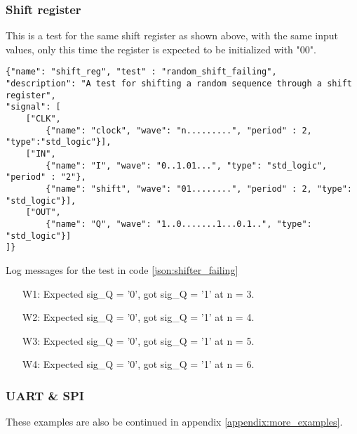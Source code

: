 \subsubsection{Shift register}
This is a test for the same shift register as shown above, with the same input values, only this time the register is expected to be initialized with "00".
\begin{lstlisting}[style=json, caption={Failing functionality test for the shifter design in appendix \ref{appendix:shifter}}, label={json:shifter_failing}]
{"name": "shift_reg", "test" : "random_shift_failing", 
"description": "A test for shifting a random sequence through a shift register", 
"signal": [
	["CLK",
		{"name": "clock", "wave": "n.........", "period" : 2, "type":"std_logic"}],
	["IN",
		{"name": "I", "wave": "0..1.01...", "type": "std_logic", "period" : "2"},
		{"name": "shift", "wave": "01........", "period" : 2, "type": "std_logic"}],
	["OUT",
		{"name": "Q", "wave": "1..0.......1...0.1..", "type": "std_logic"}]
]}
\end{lstlisting}
\begin{customenv}
	\caption{Log messages for the test in code \ref{json:shifter_failing}}
	\begin{itemize}
		\centering
		\item [W1:] Expected sig\_Q =  '0',  got sig\_Q =  '1' at n = 3.
		\item [W2:] Expected sig\_Q =  '0',  got sig\_Q =  '1' at n = 4.
		\item [W3:] Expected sig\_Q =  '0',  got sig\_Q =  '1' at n = 5.
		\item [W4:] Expected sig\_Q =  '0',  got sig\_Q =  '1' at n = 6.
		
	\end{itemize}
\end{customenv}
\newpage
\subsubsection{UART \& SPI}
These examples are also be continued in appendix \ref{appendix:more_examples}.
